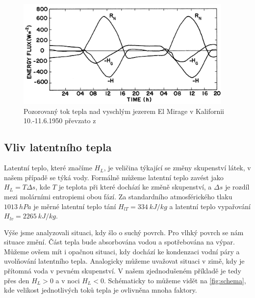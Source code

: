 \begin{figure}
	\centering
	\includegraphics[width=0.95\textwidth]{img/ch1/energy_drylakebed.png}
	\caption{Pozorovaný tok tepla nad vyschlým jezerem El Mirage v Kalifornii 10.-11.6.1950 převzato z \cite{arya2001}}
	\label{fig:energy_drylakebed}
\end{figure}

\subsection{Vliv latentního tepla}\label{chap:latentheat}
Latentní teplo, které značíme $H_L$, je veličina týkající se změny skupenství látek, v našem případě se týká vody. Formálně můžeme latentní teplo zavést jako $H_L = T\Delta s$, kde $T$ je teplota při které dochází ke změně skupenství, a $\Delta s$ je rozdíl mezi molárními entropiemi obou fází\cite{callen1985}. Za standardního atmosférického tlaku $\SI{1013}{hPa}$ je měrné latentní teplo tání $H_{lT} = \SI{334}{kJ/kg}$ a latentní teplo vypařování $H_{lv} = \SI{2265}{kJ/kg}$. 

Výše jsme analyzovali situaci, kdy šlo o suchý povrch. Pro vlhký povrch se nám situace změní. Část tepla bude absorbována vodou a spotřebována na výpar. Můžeme ovšem mít i opačnou situaci, kdy dochází ke kondenzaci vodní páry a uvolňování latentního tepla. Analogicky můžeme uvažovat situaci v zimě, kdy je přítomná voda v pevném skupenství. V našem zjednodušeném příkladě je tedy přes den $H_L > 0$ a v noci $H_L < 0$. Schématicky to můžeme vidět na \ref{fig:schema}, kde velikost jednotlivých toků tepla je ovlivněna mnoha faktory\cite{arya2001}.

